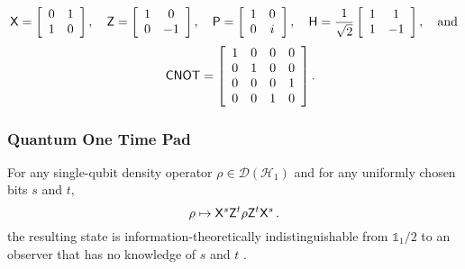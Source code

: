 $${\sf X} = \left[\begin{array}{cc} 0 & 1\\ 1 & 0\end{array}\right],
\quad{\sf Z} = \left[\begin{array}{cc} 1 & 0\\ 0 & -1\end{array}\right],
\quad{\sf P} = \left[\begin{array}{cc} 1 & 0\\ 0 & i\end{array}\right],
 \quad{\sf H} = \frac{1}{\sqrt{2}}\left[\begin{array}{cc}1 & 1\\1 & -1\end{array}\right], \quad\mbox{and}$$
$$\quad{\sf CNOT} = \left[\begin{array}{cccc} 1 & 0 & 0 & 0\\ 0 & 1 & 0 & 0\\ 0 & 0 & 0 & 1\\ 0 & 0 & 1 & 0\end{array}\right].$$

\subsubsection*{Quantum One Time Pad}
For any single-qubit density operator $\rho \in \mathcal{D} (\mathcal{H}_1)$ and for any uniformly chosen bits $s$ and $t,$ 
$$
\rho \mapsto {\sf X}^s {\sf Z}^t \rho {\sf Z}^t {\sf X}^s\,.
$$
 the resulting state is information-theoretically indistinguishable from $\mathds{1}_1/2$ to an observer that has no knowledge of $s$ and $t$ \cite{AMTW00}.

%

